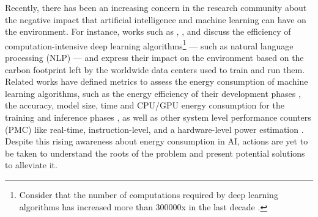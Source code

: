 Recently, there has been an increasing concern in the research community about the negative impact that artificial intelligence and machine learning can have on the environment. For instance, works such as \cite{schwartz2019green}, \cite{vinuesa2020role}, and \cite{Strubell2019EnergyAP} discuss the efficiency of computation-intensive deep learning algorithms\footnote{Consider that the number of computations required by deep learning algorithms has increased more than 300000x in the last decade \cite{schwartz2019green}.} --- such as natural language processing (NLP) --- and express their impact on the environment based on the carbon footprint left by the worldwide data centers used to train and run them. Related works have defined metrics to assess the energy consumption of machine learning algorithms, such as the energy efficiency of their development phases \cite{zhou2020hulk},  the accuracy, model size, time and CPU/GPU energy consumption for the training and inference phases \cite{Dalgren2019GreenMLA}, as well as other system level performance counters (PMC) like real-time, instruction-level, and a hardware-level power estimation \cite{garcia2019estimation}. Despite this rising awareness about energy consumption in AI, actions are yet to be taken to understand the roots of the problem and present potential solutions to alleviate it.


